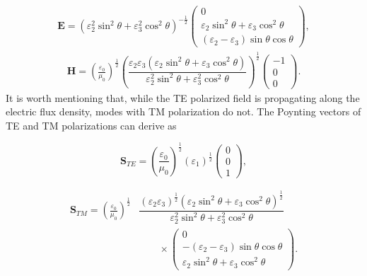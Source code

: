 \documentclass[9pt,twocolumn,twoside]{osajnl}
\begin{document}
 \begin{eqnarray}
\mathbf{E}=\left(\varepsilon_{2}^{2} \sin^{2}{\theta} + \varepsilon_{3}^{2}\cos^{2}{\theta}\right)^{-\frac{1}{2}}
 \begin{pmatrix}
 0\\ \varepsilon_{2} \sin^{2}{\theta} + \varepsilon_{3}\cos^{2}{\theta}\\ (\varepsilon_{2}-\varepsilon_{3})\sin{\theta}\cos{\theta}
 \end{pmatrix},
\end{eqnarray}
\begin{eqnarray}
 \mathbf{H}=\left(\frac{\varepsilon_{0}}{\mu_{0}}\right)^{\frac{1}{2}}\left(\dfrac{\varepsilon_{2}\varepsilon_{3}\left(\varepsilon_{2} \sin^{2}{\theta} + \varepsilon_{3}\cos^{2}{\theta}\right)}{\varepsilon_{2}^{2}\sin^{2}{\theta}+\varepsilon_{3}^{2}\cos^{2}{\theta}}\right)^{\frac{1}{2}}
 \begin{pmatrix}
 -1\\0\\0
 \end{pmatrix}.
 \end{eqnarray}
It is worth mentioning that, while the TE polarized field is propagating along the electric flux density, modes with TM polarization do not. The Poynting vectors of TE and TM polarizations can derive as

 \begin{equation}\label{ordinary-s}
\mathbf{S}_{TE}= \left(\frac{\varepsilon_{0}}{\mu_{0}}\right)^{\frac{1}{2}}(\varepsilon_{1})^{\frac{1}{2}}
 \begin{pmatrix}
 0\\0\\1
 \end{pmatrix},
  \end{equation}
 
  \begin{align}\label{extra.s}
 \mathbf{S}_{TM}= \left(\frac{\varepsilon_{0}}{\mu_{0}}\right)^{\frac{1}{2}} &\dfrac{(\varepsilon_{2}\varepsilon_{3})^{\frac{1}{2}}({\varepsilon_{2}\sin^{2}{\theta}+\varepsilon_{3}\cos^{2}{\theta}})^{\frac{1}{2}}}{\varepsilon_{2}^{2} \sin^{2}{\theta} + \varepsilon_{3}^{2}\cos^{2}{\theta}}\nonumber \\
&\qquad \times\begin{pmatrix}
 0\\ -(\varepsilon_{2}-\varepsilon_{3})\sin{\theta}\cos{\theta}  \\  \varepsilon_{2} \sin^{2}{\theta} + \varepsilon_{3}\cos^{2}{\theta}
 \end{pmatrix}. 
 \end{align}
 
\end{document}
